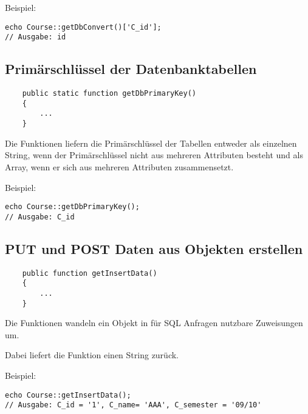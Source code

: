 \begin{minipage}{\textwidth}
Beispiel:
\begin{lstlisting}
echo Course::getDbConvert()['C_id'];
// Ausgabe: id
\end{lstlisting}
\end{minipage}

\subsection{Primärschlüssel der Datenbanktabellen}
\begin{minipage}{\textwidth}
\begin{lstlisting}
    public static function getDbPrimaryKey()
    {
    	...
    }
\end{lstlisting}
\end{minipage}

Die  Funktionen liefern die Primärschlüssel der Tabellen entweder als einzelnen String, wenn der Primärschlüssel nicht aus mehreren Attributen besteht und als Array, wenn er sich aus mehreren Attributen zusammensetzt.

\begin{minipage}{\textwidth}
Beispiel:
\begin{lstlisting}
echo Course::getDbPrimaryKey();
// Ausgabe: C_id
\end{lstlisting}
\end{minipage}

\subsection{PUT und POST Daten aus Objekten erstellen}
\begin{minipage}{\textwidth}
\begin{lstlisting}
    public function getInsertData()
    {
    	...
    }
\end{lstlisting}
\end{minipage}

Die  Funktionen wandeln ein Objekt in für SQL Anfragen nutzbare Zuweisungen um.

Dabei liefert die Funktion einen String zurück.

\begin{minipage}{\textwidth}
Beispiel:
\begin{lstlisting}
echo Course::getInsertData();
// Ausgabe: C_id = '1', C_name= 'AAA', C_semester = '09/10'
\end{lstlisting}
\end{minipage}


